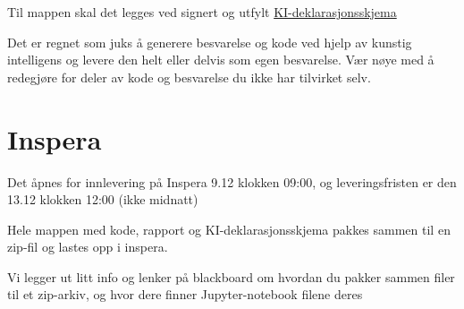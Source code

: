 \documentclass[12pt, titlepage]{article}
\begin{document}
Til mappen skal det legges ved signert og utfylt \href{https://i.ntnu.no/documents/portlet_file_entry/1305837853/NO_KI+-+deklareringsskjema+per+v%C3%A5r+2024.pdf/3b07aee3-d348-4360-e595-057ec480f1a3}{KI-deklarasjonsskjema}

Det er regnet som juks å generere besvarelse og kode ved hjelp av kunstig intelligens og levere den helt eller delvis som egen besvarelse.
Vær nøye med å redegjøre for deler av kode og besvarelse du ikke har tilvirket selv.

\section*{Inspera}

Det åpnes for innlevering på Inspera 9.12 klokken 09:00, og leveringsfristen er den 13.12 klokken 12:00 (ikke midnatt)

Hele mappen med kode, rapport og KI-deklarasjonsskjema pakkes sammen til en zip-fil og lastes opp i inspera.

Vi legger ut litt info og lenker på blackboard om hvordan du pakker sammen filer til et zip-arkiv, og hvor dere finner Jupyter-notebook filene deres
\end{document}
